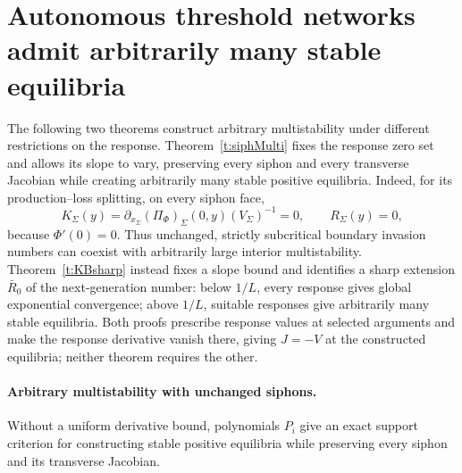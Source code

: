 \section{Autonomous threshold networks admit arbitrarily many stable equilibria}
The following two theorems construct arbitrary multistability under
different restrictions on the response.
Theorem~\ref{t:siphMulti} fixes the response zero set and
allows its slope to vary, preserving every siphon and every transverse
Jacobian while creating arbitrarily many stable positive equilibria.
Indeed, for its production--loss splitting, on every siphon face,
\[
 K_\Sigma(y)
 =\partial_{x_\Sigma}(\Pi_\Phi)_\Sigma(0,y)
   (V_\Sigma)^{-1}=0,\qquad R_\Sigma(y)=0,
\]
because $\Phi'(0)=0$.
Thus unchanged, strictly subcritical boundary invasion numbers can
coexist with arbitrarily large interior multistability.
Theorem~\ref{t:KBsharp} instead fixes a slope bound and identifies a sharp
extension $\bar R_0$ of the next-generation number: below $1/L$, every response gives global exponential
convergence; above $1/L$, suitable responses give arbitrarily many stable
equilibria.
Both proofs prescribe response values at selected arguments and make
the response derivative vanish there, giving $J=-V$ at the
constructed equilibria; neither theorem requires the other.

\paragraph{Arbitrary multistability with unchanged siphons.}
Without a uniform derivative bound, polynomials $P_i$ give an exact
support criterion for constructing stable positive equilibria while
preserving every siphon and its transverse Jacobian.

